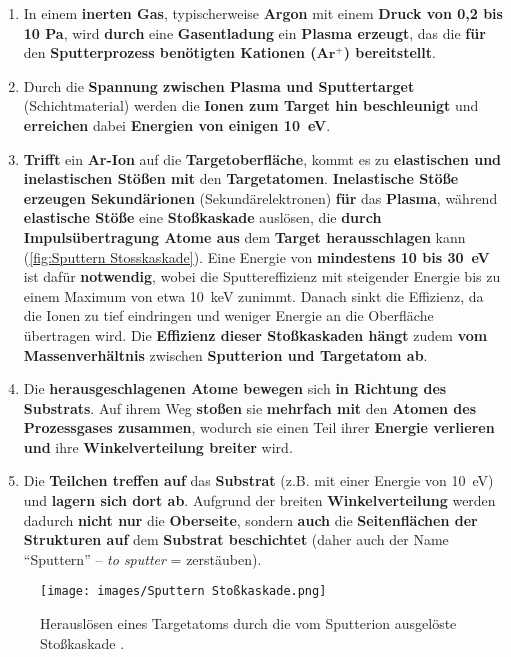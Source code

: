 \documentclass{article} %
\begin{document}
\begin{enumerate}
    \item In einem \textbf{inerten Gas}, typischerweise \textbf{Argon} mit einem \textbf{Druck von 0,2 bis 10 Pa}, wird \textbf{durch} eine 
    \textbf{Gasentladung} ein \textbf{Plasma erzeugt}, das die \textbf{für} den \textbf{Sputterprozess benötigten Kationen ($\mathbf{Ar^+}$) 
    bereitstellt}.
    \item Durch die \textbf{Spannung zwischen Plasma und Sputtertarget} (Schichtmaterial) werden die \textbf{Ionen zum Target hin beschleunigt} 
    und \textbf{erreichen} dabei \textbf{Energien von einigen 10~eV}.
    \item \textbf{Trifft} ein \textbf{Ar-Ion} auf die \textbf{Targetoberfläche}, kommt es zu \textbf{elastischen und inelastischen Stößen mit} 
    den \textbf{Targetatomen}. \textbf{Inelastische Stöße erzeugen Sekundärionen} (Sekundärelektronen) \textbf{für} das \textbf{Plasma}, während 
    \textbf{elastische Stöße} eine \textbf{Stoßkaskade} auslösen, die \textbf{durch Impulsübertragung Atome aus} dem \textbf{Target 
    herausschlagen} kann (\autoref{fig:Sputtern Stosskaskade}). Eine Energie von \textbf{mindestens 10 bis 30~eV} ist dafür \textbf{notwendig}, 
    wobei die Sputtereffizienz mit steigender Energie bis zu einem Maximum von etwa 10~keV zunimmt. Danach sinkt die Effizienz, da die Ionen zu 
    tief eindringen und weniger Energie an die Oberfläche übertragen wird. Die \textbf{Effizienz dieser Stoßkaskaden hängt} zudem 
    \textbf{vom Massenverhältnis} zwischen \textbf{Sputterion und Targetatom ab}.
    \item Die \textbf{herausgeschlagenen Atome bewegen} sich \textbf{in Richtung des Substrats}. Auf ihrem Weg \textbf{stoßen} sie 
    \textbf{mehrfach mit} den \textbf{Atomen des Prozessgases zusammen}, wodurch sie einen Teil ihrer \textbf{Energie verlieren und} ihre 
    \textbf{Winkelverteilung breiter} wird.
    \item Die \textbf{Teilchen treffen auf} das \textbf{Substrat} (z.B. mit einer Energie von 10~eV) und \textbf{lagern sich dort ab}. 
    Aufgrund der breiten \textbf{Winkelverteilung} werden dadurch \textbf{nicht nur} die \textbf{Oberseite}, sondern \textbf{auch} die 
    \textbf{Seitenflächen der Strukturen auf} dem \textbf{Substrat beschichtet} (daher auch der Name ``Sputtern'' -- \textit{to sputter} = 
    zerstäuben).
\end{enumerate}

\begin{figure}[htb!]
    \centering
    \texttt{[image: images/Sputtern Stoßkaskade.png]} %
    \captionsetup{labelfont=bf} %
    \caption{Herauslösen eines Targetatoms durch die vom Sputterion ausgelöste Stoßkaskade \cite{keplinger2024}.}
    \label{fig:Sputtern Stosskaskade}
\end{figure}
\end{document}
